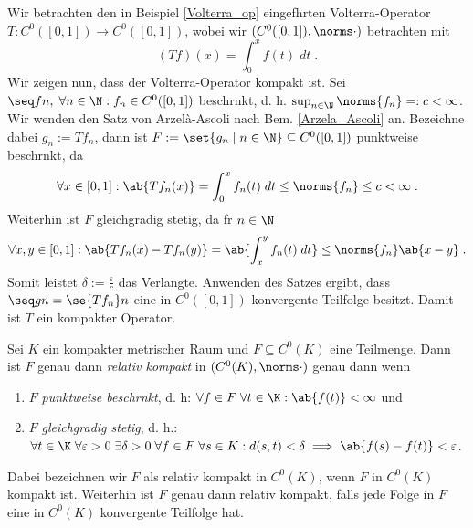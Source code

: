 \begin{ex}
	Wir betrachten den in Beispiel \ref{Volterra_op} eingef\us hrten Volterra-Operator \(T: C^0([0,1])\to C^0([0,1])\), wobei wir \((C^0([0,1]),\norms\cdot)\) betrachten mit 
	\[(Tf)(x) = \int_0^x f(t) \; dt\;.\]
	Wir zeigen nun, dass der Volterra-Operator kompakt ist. Sei \(\seq fn,\; \forall n \in \N: f_n \in C^0([0,1])\) beschr\as nkt, d. h. \(\sup_{n\in \N} \norms{f_n} =: c < \infty\). Wir wenden den Satz von Arzel\`a-Ascoli nach Bem. \ref{Arzela_Ascoli} an. Bezeichne dabei \(g_n := Tf_n\), dann ist \(F:=\set{g_n \;\vert\; n\in \N}\subseteq C^0([0,1])\) punktweise beschr\as nkt, da
	\[\forall x \in [0,1]: \ab{Tf_n(x)} = \int_0^x f_n(t)\; dt \leq \norms{f_n} \leq c < \infty\;.\]
	Weiterhin ist $F$ gleichgradig stetig, da f\us r \(n\in\N\)
	\[\forall x, y \in [0,1]: \ab{Tf_n(x) - Tf_n(y)} = \ab{\int_x^y f_n(t)\;dt} \leq \norms{f_n} \ab{x-y}\;.\]
	Somit leistet \(\delta := \frac{\varepsilon}{c}\) das Verlangte. Anwenden des Satzes ergibt, dass \(\seq gn = \se{Tf_n}n\) eine in \(C^0([0,1])\) konvergente Teilfolge besitzt. Damit ist $T$ ein kompakter Operator.
\end{ex}
\begin{rem}
	\label{Arzela_Ascoli}
	Sei $K$ ein kompakter metrischer Raum und \(F \subseteq C^0(K)\) eine Teilmenge. Dann ist $F$ genau dann \textit{relativ kompakt} in \((C^0(K), \norms\cdot)\) genau dann wenn
	\begin{enumerate}[noitemsep]
		\item $F$ \textit{punktweise beschr\as nkt}, d. h:  \(\forall f \in F\;\forall t\in \K: \ab{f(t)} < \infty\) \;\;  und 
		\item $F$ \textit{gleichgradig stetig}, d. h.: \(\forall t \in \K\;\forall \varepsilon > 0 \; \exists \delta > 0 \;\forall f\in F \; \forall s \in K: d(s,t) < 
		\delta \implies \ab{f(s) - f(t)} < \varepsilon\)\;. 
	\end{enumerate}
	Dabei bezeichnen wir $F$ als relativ kompakt in $C^0(K)$, wenn $\overline{F}$ in $C^0(K)$ kompakt ist. Weiterhin ist $F$ genau dann relativ kompakt, falls jede Folge in $F$ eine in $C^0(K)$ konvergente Teilfolge hat. 
\end{rem}